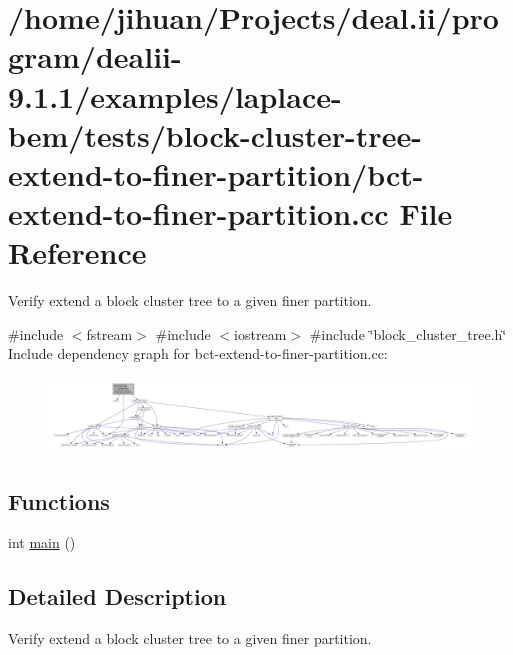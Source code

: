 \hypertarget{bct-extend-to-finer-partition_8cc}{}\section{/home/jihuan/\+Projects/deal.ii/program/dealii-\/9.1.1/examples/laplace-\/bem/tests/block-\/cluster-\/tree-\/extend-\/to-\/finer-\/partition/bct-\/extend-\/to-\/finer-\/partition.cc File Reference}
\label{bct-extend-to-finer-partition_8cc}


Verify extend a block cluster tree to a given finer partition.  


{\ttfamily \#include $<$fstream$>$}\newline
{\ttfamily \#include $<$iostream$>$}\newline
{\ttfamily \#include \char`\"{}block\+\_\+cluster\+\_\+tree.\+h\char`\"{}}\newline
Include dependency graph for bct-\/extend-\/to-\/finer-\/partition.cc\+:
\nopagebreak
\begin{figure}[H]
\begin{center}
\leavevmode
\includegraphics[width=350pt]{bct-extend-to-finer-partition_8cc__incl}
\end{center}
\end{figure}
\subsection*{Functions}
\begin{DoxyCompactItemize}
\item 
int \hyperlink{bct-extend-to-finer-partition_8cc_ae66f6b31b5ad750f1fe042a706a4e3d4}{main} ()
\end{DoxyCompactItemize}


\subsection{Detailed Description}
Verify extend a block cluster tree to a given finer partition. 

